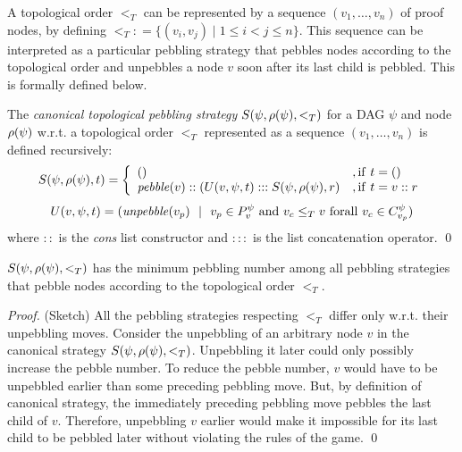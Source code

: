 \documentclass{llncs}
\newcommand{\defeq}{\mathrel{\mathop:}=}
\begin{document}
\noindent
A topological order $<_T$ can be represented by a sequence $(v_1,\dots,v_n)$ of proof nodes, by defining $<_T \defeq \{(v_i,v_j) \mid 1 \leq i < j \leq n\}$. This sequence can be interpreted as a particular pebbling strategy that pebbles nodes according to the topological order and unpebbles a node $v$ soon after its last child is pebbled. This is formally defined below.

\newcommand{\cstrategy}[3]{S(#1,#2,#3)}

\begin{definition}
The \emph{canonical topological pebbling strategy} $\cstrategy{\psi}{\raiz{\psi}}{<_T}$ for a DAG $\psi$ and node $\rho(\psi)$ w.r.t. a topological order $<_T$ represented as a sequence $(v_1,\dots,v_n)$ is defined recursively:
$$
\cstrategy{\psi}{\raiz{\psi}}{t} = \left\{\begin{array}{ll}  
                 () & , \mathrm{if } \ t = () \\
                 \mathit{pebble}(v)::(U(v, \psi, t):::\cstrategy{\psi}{\raiz{\psi}}{r} & , \mathrm{if } \ t = v::r 
               \end{array}\right.
$$
$$
U(v, \psi, t) = (\mathit{unpebble}(v_p) \ \  | \ \ v_p \in \Premises{v}{\psi} \ \mathrm{and} \ v_c \leq_T v \ \mathrm{for all} \ v_c \in \Children{v_p}{\psi})
$$
%
where $::$ is the \emph{cons} list constructor and $:::$ is the list concatenation operator.
\qed
\end{definition}

\begin{theorem}
\label{theorem:canonical}
$\cstrategy{\psi}{\raiz{\psi}}{<_T}$ has the minimum pebbling number among all pebbling strategies that pebble nodes according to the topological order $<_T$.
\end{theorem}
\begin{proof} (Sketch)
All the pebbling strategies respecting $<_T$ differ only w.r.t. their unpebbling moves.
Consider the unpebbling of an arbitrary node $v$ in the canonical strategy $\cstrategy{\psi}{\raiz{\psi}}{<_T}$. Unpebbling it later could only possibly increase the pebble number. To reduce the pebble number, $v$ would have to be unpebbled earlier than some preceding pebbling move. But, by definition of canonical strategy, the immediately preceding pebbling move pebbles the last child of $v$. Therefore, unpebbling $v$ earlier would make it impossible for its last child to be pebbled later without violating the rules of the game.
\qed
\end{proof}
\end{document}
